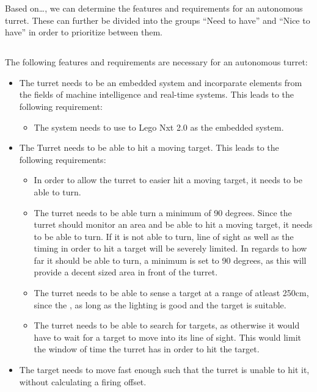 Based on\ldots, we can determine the features and requirements for an autonomous
turret. These can further be divided into the groups ``Need to have'' and
``Nice to have'' in order to prioritize between them.

\subsection{}
The following features and requirements are necessary for an autonomous turret:
\begin{itemize}
  \item The turret needs to be an embedded system and incorparate elements from
the fields of machine intelligence and real-time systems. This leads to the
following requirement:
\begin{itemize}
  \item The system needs to use to Lego Nxt 2.0 as the embedded system.
\end{itemize}
  \item The Turret needs to be able to hit a moving target. This leads to the
  following requirements:
  \begin{itemize}
    \item In order to allow the turret to easier hit a moving target, it needs
    to be able to turn. 
    \item The turret needs to be able turn a minimum of 90 degrees. Since the
    turret should monitor an area and be able to hit a moving target, it needs
    to be able to turn. If it is not able to turn, line of sight as well as the
    timing in order to hit a target will be severely limited. In regards to how
    far it should be able to turn, a minimum is set to 90 degrees, as this will
    provide a decent sized area in front of the turret.
    \item The turret needs to be able to sense a target at a range of atleast
    250cm, since the , as long as the
    lighting is good and the target is suitable.
    \item The turret needs to be able to search for targets, as otherwise it
    would have to wait for a target to move into its line of sight. This would
    limit the window of time the turret has in order to hit the target.
  \end{itemize}  
\item The target needs to move fast enough such that the turret is unable to
hit it, without calculating a firing offset.
\end{itemize}

